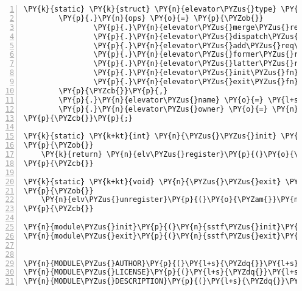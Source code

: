 \begin{Verbatim}[commandchars=\\\{\},numbers=left,firstnumber=1,stepnumber=1]
\PY{k}{static} \PY{k}{struct} \PY{n}{elevator\PYZus{}type} \PY{n}{elevator\PYZus{}sstf} \PY{o}{=} \PY{p}{\PYZob{}}
		\PY{p}{.}\PY{n}{ops} \PY{o}{=} \PY{p}{\PYZob{}}
				\PY{p}{.}\PY{n}{elevator\PYZus{}merge\PYZus{}req\PYZus{}fn}		\PY{o}{=} \PY{n}{sstf\PYZus{}merged\PYZus{}requests}\PY{p}{,}
				\PY{p}{.}\PY{n}{elevator\PYZus{}dispatch\PYZus{}fn}		\PY{o}{=} \PY{n}{sstf\PYZus{}dispatch}\PY{p}{,}
				\PY{p}{.}\PY{n}{elevator\PYZus{}add\PYZus{}req\PYZus{}fn}		\PY{o}{=} \PY{n}{sstf\PYZus{}add\PYZus{}request}\PY{p}{,}
				\PY{p}{.}\PY{n}{elevator\PYZus{}former\PYZus{}req\PYZus{}fn}		\PY{o}{=} \PY{n}{sstf\PYZus{}former\PYZus{}request}\PY{p}{,}
				\PY{p}{.}\PY{n}{elevator\PYZus{}latter\PYZus{}req\PYZus{}fn}		\PY{o}{=} \PY{n}{sstf\PYZus{}latter\PYZus{}request}\PY{p}{,}
				\PY{p}{.}\PY{n}{elevator\PYZus{}init\PYZus{}fn}		\PY{o}{=} \PY{n}{sstf\PYZus{}init\PYZus{}queue}\PY{p}{,}
				\PY{p}{.}\PY{n}{elevator\PYZus{}exit\PYZus{}fn}		\PY{o}{=} \PY{n}{sstf\PYZus{}exit\PYZus{}queue}\PY{p}{,}
		\PY{p}{\PYZcb{}}\PY{p}{,}
		\PY{p}{.}\PY{n}{elevator\PYZus{}name} \PY{o}{=} \PY{l+s}{\PYZdq{}}\PY{l+s}{sstf}\PY{l+s}{\PYZdq{}}\PY{p}{,}
		\PY{p}{.}\PY{n}{elevator\PYZus{}owner} \PY{o}{=} \PY{n}{THIS\PYZus{}MODULE}\PY{p}{,}
\PY{p}{\PYZcb{}}\PY{p}{;}

\PY{k}{static} \PY{k+kt}{int} \PY{n}{\PYZus{}\PYZus{}init} \PY{n+nf}{sstf\PYZus{}init}\PY{p}{(}\PY{k+kt}{void}\PY{p}{)}
\PY{p}{\PYZob{}}
	\PY{k}{return} \PY{n}{elv\PYZus{}register}\PY{p}{(}\PY{o}{\PYZam{}}\PY{n}{elevator\PYZus{}sstf}\PY{p}{)}\PY{p}{;}
\PY{p}{\PYZcb{}}

\PY{k}{static} \PY{k+kt}{void} \PY{n}{\PYZus{}\PYZus{}exit} \PY{n+nf}{sstf\PYZus{}exit}\PY{p}{(}\PY{k+kt}{void}\PY{p}{)}
\PY{p}{\PYZob{}}
	\PY{n}{elv\PYZus{}unregister}\PY{p}{(}\PY{o}{\PYZam{}}\PY{n}{elevator\PYZus{}sstf}\PY{p}{)}\PY{p}{;}
\PY{p}{\PYZcb{}}

\PY{n}{module\PYZus{}init}\PY{p}{(}\PY{n}{sstf\PYZus{}init}\PY{p}{)}\PY{p}{;}
\PY{n}{module\PYZus{}exit}\PY{p}{(}\PY{n}{sstf\PYZus{}exit}\PY{p}{)}\PY{p}{;}


\PY{n}{MODULE\PYZus{}AUTHOR}\PY{p}{(}\PY{l+s}{\PYZdq{}}\PY{l+s}{Andy Chase}\PY{l+s}{\PYZdq{}}\PY{p}{)}\PY{p}{;}
\PY{n}{MODULE\PYZus{}LICENSE}\PY{p}{(}\PY{l+s}{\PYZdq{}}\PY{l+s}{GPL}\PY{l+s}{\PYZdq{}}\PY{p}{)}\PY{p}{;}
\PY{n}{MODULE\PYZus{}DESCRIPTION}\PY{p}{(}\PY{l+s}{\PYZdq{}}\PY{l+s}{sstf IO scheduler}\PY{l+s}{\PYZdq{}}\PY{p}{)}\PY{p}{;}
\end{Verbatim}
